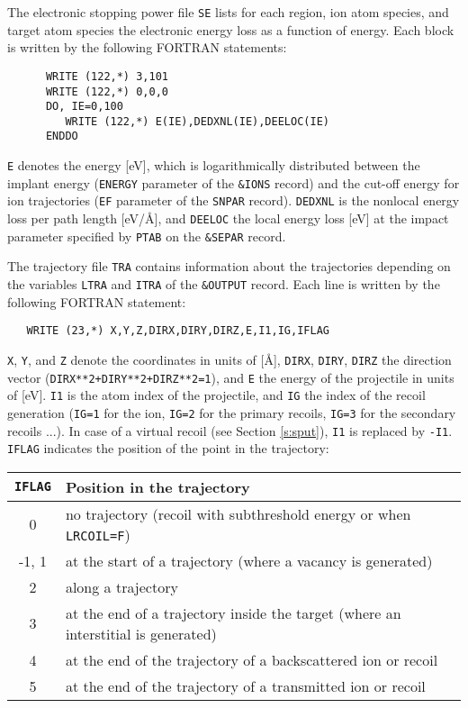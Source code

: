 The electronic stopping power file \texttt{SE} lists for each region, ion atom
species, and target atom species the electronic energy loss as a function of
energy. Each block is written by the following FORTRAN statements:
%
\begin{verbatim}
      WRITE (122,*) 3,101
      WRITE (122,*) 0,0,0
      DO, IE=0,100
         WRITE (122,*) E(IE),DEDXNL(IE),DEELOC(IE)
      ENDDO
\end{verbatim}
%
\texttt{E} denotes the energy [eV], which is logarithmically distributed between
the implant energy (\texttt{ENERGY} parameter of the \texttt{\&IONS} record) and
the cut-off energy for ion trajectories (\texttt{EF} parameter of the
\texttt{SNPAR} record). \texttt{DEDXNL} is the nonlocal energy loss per path
length [eV/\AA], and \texttt{DEELOC} the local energy loss [eV] at the impact
parameter specified by \texttt{PTAB} on the \texttt{\&SEPAR} record.

The trajectory file \texttt{TRA} contains information about the trajectories
depending on the variables \texttt{LTRA} and \texttt{ITRA} of the
\texttt{\&OUTPUT} record. Each line is written by the following FORTRAN
statement:
%
\begin{verbatim}
   WRITE (23,*) X,Y,Z,DIRX,DIRY,DIRZ,E,I1,IG,IFLAG
\end{verbatim}
%
\texttt{X}, \texttt{Y}, and \texttt{Z} denote the coordinates in units of [\AA],
\texttt{DIRX}, \texttt{DIRY}, \texttt{DIRZ} the direction vector
(\texttt{DIRX**2+DIRY**2+DIRZ**2=1}), and \texttt{E} the energy of the
projectile in units of [eV]. \texttt{I1} is the atom index of the projectile,
and \texttt{IG} the index of the recoil generation (\texttt{IG=1} for the ion,
\texttt{IG=2} for the primary recoils, \texttt{IG=3} for the secondary recoils
...).  In case of a virtual recoil (see Section \ref{s:sput}), \texttt{I1} is
replaced by \texttt{-I1}. \texttt{IFLAG} indicates the position of the point in
the trajectory:
%
\bigskip
%
\begin{center}
\begin{tabular}{|c|p{}|}
\hline
\texttt{IFLAG} & Position in the trajectory                               \\
\hline
0              & no trajectory (recoil with subthreshold energy or when \texttt{LRCOIL=F}) \\
-1, 1          & at the start of a trajectory (where a vacancy is generated) \\
2              & along a trajectory \\
3              & at the end of a trajectory inside the target (where an interstitial is 
                 generated) \\
4              & at the end of the trajectory of a backscattered ion or recoil \\
5              & at the end of the trajectory of a transmitted ion or recoil \\
\hline
\end{tabular}
\end{center}

